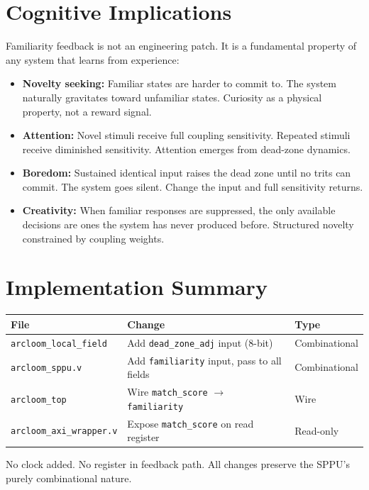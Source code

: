 \documentclass[11pt, a4paper]{report}
\begin{document}
\section{Cognitive Implications}

Familiarity feedback is not an engineering patch. It is a fundamental
property of any system that learns from experience:

\begin{itemize}[nosep]
  \item \textbf{Novelty seeking:} Familiar states are harder to commit to.
    The system naturally gravitates toward unfamiliar states. Curiosity as
    a physical property, not a reward signal.
  \item \textbf{Attention:} Novel stimuli receive full coupling sensitivity.
    Repeated stimuli receive diminished sensitivity. Attention emerges from
    dead-zone dynamics.
  \item \textbf{Boredom:} Sustained identical input raises the dead zone until
    no trits can commit. The system goes silent. Change the input and full
    sensitivity returns.
  \item \textbf{Creativity:} When familiar responses are suppressed, the only
    available decisions are ones the system has never produced before.
    Structured novelty constrained by coupling weights.
\end{itemize}

\section{Implementation Summary}

\begin{longtable}{@{}lll@{}}
\toprule
\textbf{File} & \textbf{Change} & \textbf{Type} \\
\midrule
\endhead
\texttt{arcloom\_local\_field} & Add \texttt{dead\_zone\_adj} input (8-bit) & Combinational \\
\texttt{arcloom\_sppu.v} & Add \texttt{familiarity} input, pass to all fields & Combinational \\
\texttt{arcloom\_top} & Wire \texttt{match\_score} $\rightarrow$ \texttt{familiarity} & Wire \\
\texttt{arcloom\_axi\_wrapper.v} & Expose \texttt{match\_score} on read register & Read-only \\
\bottomrule
\end{longtable}

No clock added. No register in feedback path. All changes preserve the
SPPU's purely combinational nature.
\end{document}
